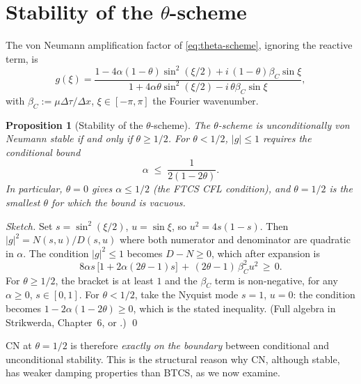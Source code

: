 \documentclass[11pt,a4paper]{article}
\newtheorem{proposition}{Proposition}[section]
\begin{document}
\section{Stability of the $\theta$-scheme}

The von Neumann amplification factor of \eqref{eq:theta-scheme},
ignoring the reactive term, is
\begin{equation}
g(\xi) = \frac{1 - 4\alpha(1-\theta)\sin^2(\xi/2) + i\,(1-\theta)\beta_C\sin\xi}
              {1 + 4\alpha\theta\sin^2(\xi/2) - i\,\theta\beta_C\sin\xi},
\label{eq:theta-amplification}
\end{equation}
with $\beta_C := \mu\Delta\tau/\Delta x$, $\xi \in [-\pi,\pi]$ the
Fourier wavenumber.

\begin{proposition}[Stability of the $\theta$-scheme]
The $\theta$-scheme is unconditionally von Neumann stable if and only
if $\theta \ge 1/2$. For $\theta < 1/2$, $|g| \le 1$ requires the
conditional bound
\[
\alpha \;\le\; \frac{1}{2(1 - 2\theta)}.
\]
In particular, $\theta = 0$ gives $\alpha \le 1/2$ (the FTCS CFL
condition), and $\theta = 1/2$ is the smallest $\theta$ for which the
bound is vacuous.
\end{proposition}

\begin{proof}[Sketch]
Set $s = \sin^2(\xi/2)$, $u = \sin\xi$, so $u^2 = 4s(1-s)$. Then
$|g|^2 = N(s,u)/D(s,u)$ where both numerator and denominator are
quadratic in $\alpha$. The condition $|g|^2 \le 1$ becomes $D - N \ge
0$, which after expansion is
\[
8\alpha s\,\bigl[1 + 2\alpha(2\theta - 1)s\bigr]
\,+\,(2\theta - 1)\,\beta_C^2 u^2
\,\ge\, 0.
\]
For $\theta \ge 1/2$, the bracket is at least $1$ and the $\beta_C$ term
is non-negative, for any $\alpha \ge 0$, $s \in [0,1]$. For
$\theta < 1/2$, take the Nyquist mode $s = 1$, $u = 0$: the condition
becomes $1 - 2\alpha(1 - 2\theta) \ge 0$, which is the stated
inequality. (Full algebra in Strikwerda, Chapter~6, or \cite{Smith1985}.) \qed
\end{proof}

CN at $\theta = 1/2$ is therefore \emph{exactly on the boundary}
between conditional and unconditional stability. This is the structural
reason why CN, although stable, has weaker damping properties than
BTCS, as we now examine.

\end{document}
